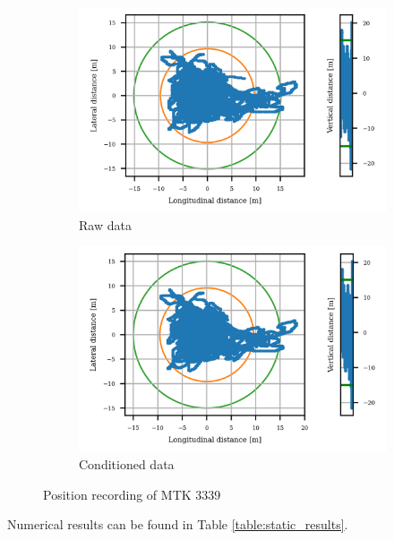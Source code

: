 \documentclass{article}
\begin{document}
			\begin{figure}[h]
		   		\centering
		     	\begin{subfigure}[b]{0.45\textwidth}
		      		\centering
		      	  	\includegraphics[width=\textwidth]{Static/raw_static_U-blox M8N.png}
		      	  	\caption{Raw data}
		     	\end{subfigure}
		     	\begin{subfigure}[b]{0.45\textwidth}
		      	   \centering
		      	   \includegraphics[width=\textwidth]{Static/cond_static_U-blox M8N.png}
		      	   \caption{Conditioned data}
		     	\end{subfigure}
		      \caption{Position recording of MTK 3339}
		      \label{fig:static_loc_gadget2}
			\end{figure}	
			Numerical results can be found in Table \ref{table:static_results}.
\end{document}
